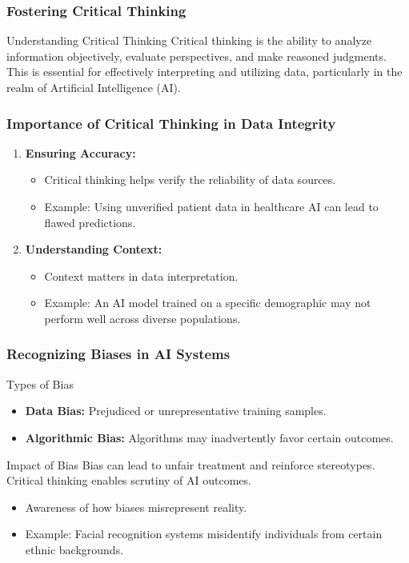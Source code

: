 \documentclass[aspectratio=169]{beamer}
\begin{document}
\begin{frame}[fragile]
    \frametitle{Fostering Critical Thinking}
    \begin{block}{Understanding Critical Thinking}
        Critical thinking is the ability to analyze information objectively, evaluate perspectives, and make reasoned judgments. This is essential for effectively interpreting and utilizing data, particularly in the realm of Artificial Intelligence (AI).
    \end{block}
\end{frame}

\begin{frame}[fragile]
    \frametitle{Importance of Critical Thinking in Data Integrity}
    \begin{enumerate}
        \item \textbf{Ensuring Accuracy:}
        \begin{itemize}
            \item Critical thinking helps verify the reliability of data sources.
            \item Example: Using unverified patient data in healthcare AI can lead to flawed predictions.
        \end{itemize}

        \item \textbf{Understanding Context:}
        \begin{itemize}
            \item Context matters in data interpretation.
            \item Example: An AI model trained on a specific demographic may not perform well across diverse populations.
        \end{itemize}
    \end{enumerate}
\end{frame}

\begin{frame}[fragile]
    \frametitle{Recognizing Biases in AI Systems}
    \begin{block}{Types of Bias}
        \begin{itemize}
            \item \textbf{Data Bias:} Prejudiced or unrepresentative training samples.
            \item \textbf{Algorithmic Bias:} Algorithms may inadvertently favor certain outcomes.
        \end{itemize}
    \end{block}

    \begin{block}{Impact of Bias}
        Bias can lead to unfair treatment and reinforce stereotypes. Critical thinking enables scrutiny of AI outcomes.
        \begin{itemize}
            \item Awareness of how biases misrepresent reality.
            \item Example: Facial recognition systems misidentify individuals from certain ethnic backgrounds.
        \end{itemize}
    \end{block}
\end{frame}
\end{document}
